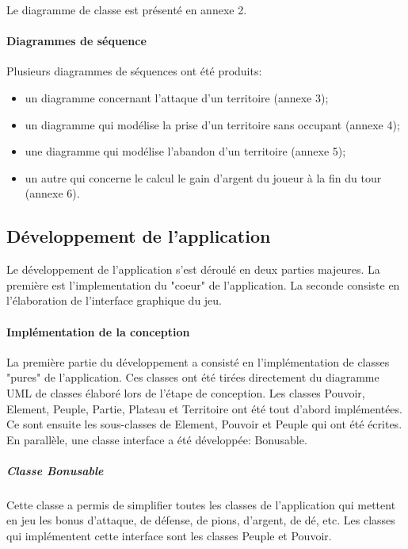 \documentclass[a4paper, 11pt]{article}
\begin{document}
			Le diagramme de classe est présenté en annexe 2.
			
			\paragraph{Diagrammes de séquence\\}
			
			Plusieurs diagrammes de séquences ont été produits:
			\begin{itemize}
				\item un diagramme concernant l'attaque d'un territoire (annexe 3);
				\item un diagramme qui modélise la prise d'un territoire sans occupant (annexe 4);
				\item une diagramme qui modélise l'abandon d'un territoire (annexe 5);
				\item un autre qui concerne le calcul le gain d'argent du joueur à la fin du tour (annexe 6).
			\end{itemize}
		
		\subsection{Développement de l'application}
		
		Le développement de l'application s'est déroulé en deux parties majeures. La première est l'implementation du "coeur" de l'application. La seconde consiste en l'élaboration de l'interface graphique du jeu.
		
			\paragraph{Implémentation de la conception\\}
			
			La première partie du développement a consisté en l'implémentation de classes "pures" de l'application. Ces classes ont été tirées directement du diagramme UML de classes élaboré lors de l'étape de conception. Les classes Pouvoir, Element, Peuple, Partie, Plateau et Territoire ont été tout d'abord implémentées. Ce sont ensuite les sous-classes de Element, Pouvoir et Peuple qui ont été écrites. En parallèle, une classe interface a été développée: Bonusable.
				
				\subparagraph{Classe Bonusable}
			 Cette classe a permis de simplifier toutes les classes de l'application qui mettent en jeu les bonus d'attaque, de défense, de pions, d'argent, de dé, etc. Les classes qui implémentent cette interface sont les classes Peuple et Pouvoir. \\
			 
\end{document}
